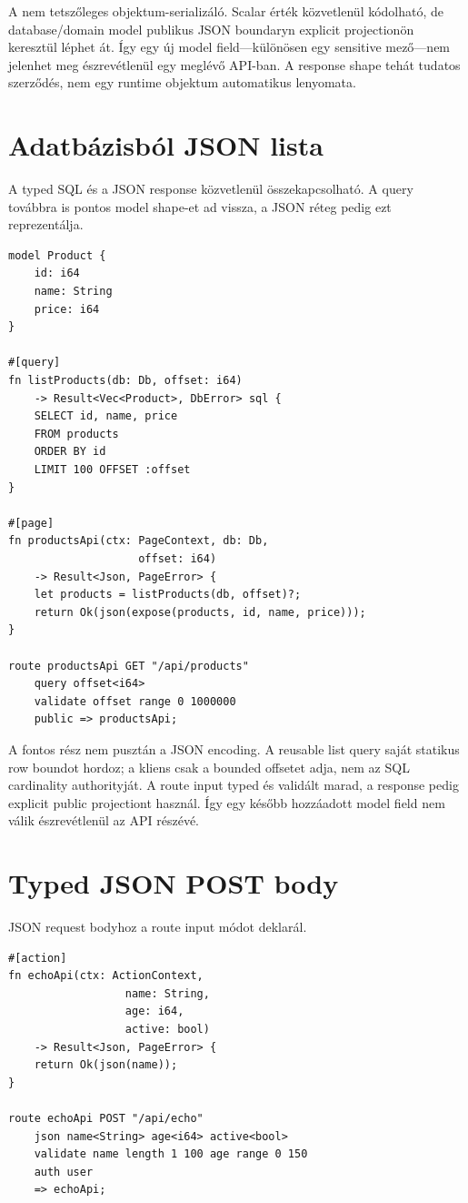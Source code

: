 A  nem tetszőleges objektum-serializáló. Scalar érték közvetlenül kódolható, de database/domain model publikus JSON boundaryn explicit  projectionön keresztül léphet át. Így egy új model field---különösen egy sensitive mező---nem jelenhet meg észrevétlenül egy meglévő API-ban. A response shape tehát tudatos szerződés, nem egy runtime objektum automatikus lenyomata.

\section{Adatbázisból JSON lista}

A typed SQL és a JSON response közvetlenül összekapcsolható. A query továbbra is pontos model shape-et ad vissza, a JSON réteg pedig ezt reprezentálja.

\begin{lstlisting}[language=Velran]
model Product {
    id: i64
    name: String
    price: i64
}

#[query]
fn listProducts(db: Db, offset: i64)
    -> Result<Vec<Product>, DbError> sql {
    SELECT id, name, price
    FROM products
    ORDER BY id
    LIMIT 100 OFFSET :offset
}

#[page]
fn productsApi(ctx: PageContext, db: Db,
                    offset: i64)
    -> Result<Json, PageError> {
    let products = listProducts(db, offset)?;
    return Ok(json(expose(products, id, name, price)));
}

route productsApi GET "/api/products"
    query offset<i64>
    validate offset range 0 1000000
    public => productsApi;
\end{lstlisting}

A fontos rész nem pusztán a JSON encoding. A reusable list query saját statikus row boundot hordoz; a kliens csak a bounded offsetet adja, nem az SQL cardinality authorityját. A route input typed és validált marad, a response pedig explicit public projectiont használ. Így egy később hozzáadott model field nem válik észrevétlenül az API részévé.

\section{Typed JSON POST body}

JSON request bodyhoz a route  input módot deklarál.

\begin{lstlisting}[language=Velran]
#[action]
fn echoApi(ctx: ActionContext,
                  name: String,
                  age: i64,
                  active: bool)
    -> Result<Json, PageError> {
    return Ok(json(name));
}

route echoApi POST "/api/echo"
    json name<String> age<i64> active<bool>
    validate name length 1 100 age range 0 150
    auth user
    => echoApi;
\end{lstlisting}

